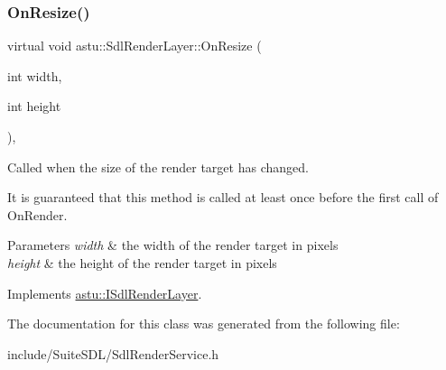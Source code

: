 \subsubsection{\texorpdfstring{On\+Resize()}{OnResize()}}
{\footnotesize\ttfamily virtual void astu\+::\+Sdl\+Render\+Layer\+::\+On\+Resize (\begin{DoxyParamCaption}\item[{int}]{width,  }\item[{int}]{height }\end{DoxyParamCaption})\hspace{0.3cm}{\ttfamily [override]}, {\ttfamily [virtual]}}

Called when the size of the render target has changed.

It is guaranteed that this method is called at least once before the first call of {\ttfamily On\+Render}.


\begin{DoxyParams}{Parameters}
{\em width} & the width of the render target in pixels \\
\hline
{\em height} & the height of the render target in pixels \\
\hline
\end{DoxyParams}


Implements \hyperlink{classastu_1_1ISdlRenderLayer_abcded808a2405e1e59413b5d1f981f13}{astu\+::\+I\+Sdl\+Render\+Layer}.



The documentation for this class was generated from the following file\+:\begin{DoxyCompactItemize}
\item 
include/\+Suite\+S\+D\+L/Sdl\+Render\+Service.\+h\end{DoxyCompactItemize}
